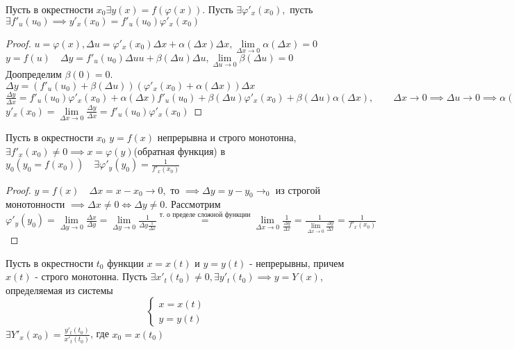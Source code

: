 \documentclass[../main.tex]{subfiles}
\begin{document}
\begin{theorem}
    Пусть в окрестности $x_{0} \exists y(x)=f(\varphi(x)).$ Пусть $\exists \varphi'_{x}(x_{0}),$ пусть $\exists f'_{u}(u_{0})\implies y'_{x}(x_{0})=f'_{u}(u_{0})\varphi'_{x}(x_{0})$
\end{theorem}
\begin{proof}
    $u=\varphi(x),\Delta u=\varphi'_{x}(x_{0})\Delta x+\alpha(\Delta x)\Delta x, \lim\limits_{\Delta x\to 0} \alpha(\Delta x)=0$\\ 
    $y=f(u)\quad \Delta y=f'_{u}(u_{0})\Delta uu + \beta (\Delta u)\Delta u, \lim\limits_{\Delta u\to 0} \beta(\Delta u)=0 $\\ 
    Доопределим $\beta(0)=0.$\\ 
    $\Delta y=(f'_{u}(u_{0})+\beta(\Delta u))(\varphi'_{x}(x_{0})+\alpha(\Delta x))\Delta x$\\ 
    $\frac{\Delta y}{\Delta x}=f'_{u}(u_{0})\varphi'_{x}(x_{0})+\alpha(\Delta x)f'_{u}(u_{0})+\beta(\Delta u)\varphi'_{x}(x_{0})+\beta(\Delta u)\alpha(\Delta x), \qquad\Delta x\to 0 \implies \Delta u \to 0 \implies \alpha(\Delta x) \to 0 \implies \beta(\Delta u)\to 0$\\ 
    $y'_{x}(x_{0})=\lim\limits_{\Delta x\to 0} \frac{\Delta y}{\Delta x}=f'_{u}(u_{0})\varphi'_{x}(x_{0}) $
\end{proof}

\begin{theorem}
    Пусть в окрестности $x_{0}$ $y=f(x)$ непрерывна и строго монотонна, $\exists f'_{x}(x_{0})\neq 0 \implies x=\varphi(y)$(обратная функция) в $y_{0}(y_{0}=f(x_{0}))\quad \exists \varphi'_{y}(y_{0})=\frac{1}{f'_{x}(x_{0})}$
\end{theorem}
\begin{proof}
    $y=f(x)\quad \Delta x=x-x_{0} \to 0,$ то $\implies \Delta y=y-y_{0} \to_{0}$ из строгой монотонности $\implies \Delta x\neq 0 \Leftrightarrow \Delta y\neq 0$. Рассмотрим $\varphi'_{y}(y_{0})=\lim\limits_{\Delta y\to 0}\frac{\Delta x}{\Delta y}= \lim\limits_{\Delta y\to 0} \frac{1}{\Delta y \frac{1}{\Delta x}} \overset{\text{т. о пределе сложной функции}}{=} \lim\limits_{\Delta x\to 0} \frac{1}{\frac{\Delta  y}{\Delta x}}=\frac{1}{\lim\limits_{\Delta x\to 0} \frac{\Delta y}{\Delta x}}=\frac{1}{f'_{x}(x_{0})}    $
\end{proof}

\begin{theorem}
    Пусть в окрестности $t_{0}$ функции $x=x(t)$ и $y=y(t)$ - непрерывны, причем $x(t)$ - строго монотонна. Пусть $\exists x'_{t}(t_{0})\neq 0,\exists y'_{t}(t_{0})\implies y=Y(x)$, определяемая из
    системы \[\begin{cases}
        x=x(t) & \\
        y=y(t)
    \end{cases}\] $\exists Y'_{x}(x_{0})=\frac{y'_{t}(t_{0})}{x'_{t}(t_{0})}$, где $x_{0}=x(t_{0})$
\end{theorem}
\end{document}
